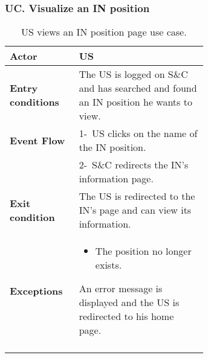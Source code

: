 \subsubsection*{UC\cuc . Visualize an IN position}
\begin{center}
    \begin{longtable}{|l|p{0.65\linewidth}|}
        \hline
        \textbf{Actor}            & US \\
        \hline
        \textbf{Entry conditions} & The US is logged on S\&C and has searched and found an IN position he wants to view. \\
        \hline
        \textbf{Event Flow}       & 1-\ US clicks on the name of the IN position.  \\
        & 2-\ S\&C redirects the IN's information page.\\
        \hline
        \textbf{Exit condition}   &  The US is redirected to the IN's page and can view its information.\\
        \hline
        \textbf{Exceptions}       & \begin{itemize}
            \item The position no longer exists.
        \end{itemize} An error message is displayed and the US is redirected to his home page.
        \\
        \hline
        \caption{US views an IN position page use case.}
        \label{tab: cp_use_case}
    \end{longtable}
\end{center}




